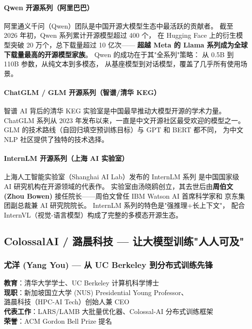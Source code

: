 \paragraph{Qwen 开源系列（阿里巴巴）}
阿里通义千问（Qwen）团队是中国开源大模型生态中最活跃的贡献者。
截至 2026 年初，Qwen 系列累计开源模型超过 400 个，
在 Hugging Face 上的衍生模型突破 20 万个，总下载量超过 10 亿次——
\textbf{超越 Meta 的 Llama 系列成为全球下载量最高的开源模型家族}。
Qwen 的成功在于其"全系列"策略：
从 0.5B 到 110B 参数，从纯文本到多模态，
从基座模型到对话模型，覆盖了几乎所有使用场景。

\paragraph{ChatGLM / GLM 开源系列（智谱/清华 KEG）}
智谱 AI 背后的清华 KEG 实验室是中国最早推动大模型开源的学术力量。
ChatGLM 系列从 2023 年发布以来，一直是中文开源社区最受欢迎的模型之一。
GLM 的技术路线（自回归填空预训练目标）与 GPT 和 BERT 都不同，
为中文 NLP 社区提供了独特的技术选择。

\paragraph{InternLM 开源系列（上海 AI 实验室）}
上海人工智能实验室（Shanghai AI Lab）发布的 InternLM 系列
是中国国家级 AI 研究机构在开源领域的代表作。
实验室由汤晓鸥创立，其去世后由\textbf{周伯文 (Zhou Bowen)}
接任院长——周伯文曾任 IBM Watson AI 首席科学家和
京东集团副总裁兼 AI 研究院院长。
InternLM 系列的特色是"强推理+长上下文"，
配合 InternVL（视觉-语言模型）构成了完整的多模态开源生态。


\subsection{ColossalAI / 潞晨科技 — 让大模型训练"人人可及"}

\subsubsection{尤洋 (Yang You) — 从 UC Berkeley 到分布式训练先锋}

\begin{keybox}[人物档案：尤洋]
\textbf{教育}：清华大学学士、UC Berkeley 计算机科学博士 \\
\textbf{现职}：新加坡国立大学 (NUS) Presidential Young Professor、\\
\quad 潞晨科技（HPC-AI Tech）创始人兼 CEO \\
\textbf{代表工作}：LARS/LAMB 大批量优化器、Colossal-AI 分布式训练框架 \\
\textbf{荣誉}：ACM Gordon Bell Prize 提名
\end{keybox}

